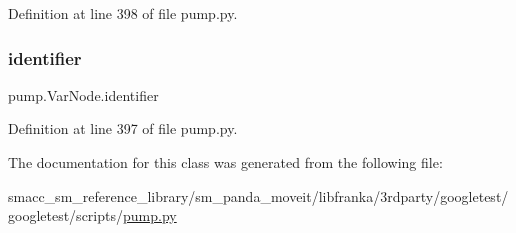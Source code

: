 Definition at line 398 of file pump.\+py.

\mbox{\label{classpump_1_1VarNode_aa2b634e2443646c3754f2d193efa4dc7}} 
\subsubsection{\texorpdfstring{identifier}{identifier}}
{\footnotesize\ttfamily pump.\+Var\+Node.\+identifier}



Definition at line 397 of file pump.\+py.



The documentation for this class was generated from the following file\+:\begin{DoxyCompactItemize}
\item 
smacc\+\_\+sm\+\_\+reference\+\_\+library/sm\+\_\+panda\+\_\+moveit/libfranka/3rdparty/googletest/googletest/scripts/\hyperlink{pump_8py}{pump.\+py}\end{DoxyCompactItemize}
